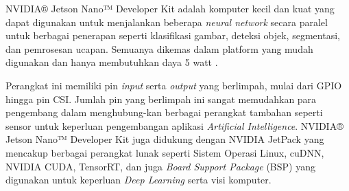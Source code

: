 NVIDIA® Jetson Nano™ Developer Kit adalah komputer kecil dan kuat yang dapat digunakan untuk menjalankan beberapa \emph{neural network} secara paralel untuk berbagai penerapan seperti klasifikasi gambar, deteksi objek, segmentasi, dan pemrosesan ucapan. Semuanya dikemas dalam platform yang mudah digunakan dan hanya membutuhkan daya 5 watt \parencite{Developer_2023}.

Perangkat ini memiliki pin \emph{input} serta \emph{output} yang berlimpah, mulai dari GPIO hingga pin CSI. Jumlah pin yang berlimpah ini sangat memudahkan para pengembang dalam menghubung-kan berbagai perangkat tambahan seperti sensor untuk keperluan pengembangan aplikasi \emph{Artificial Intelligence}. NVIDIA® Jetson Nano™ Developer Kit juga didukung dengan NVIDIA JetPack yang mencakup berbagai perangkat lunak seperti Sistem Operasi Linux, cuDNN, NVIDIA CUDA, TensorRT, dan juga \emph{Board Support Package} (BSP) yang digunakan untuk keperluan \emph{Deep Learning} serta visi komputer.